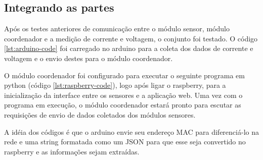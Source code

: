 \subsection{Integrando as partes}

Após os testes anteriores de comunicação entre o módulo sensor, módulo coordenador e a medição de corrente e voltagem, o conjunto foi testado. O código \ref{lst:arduino-code} foi carregado no arduino para a coleta dos dados de corrente e voltagem e o envio destes para o módulo coordenador.



O módulo coordenador foi configurado para executar o seguinte programa em python (código \ref{lst:raspberry-code}), logo após ligar o raspberry, para a inicialização da interface entre os sensores e a aplicação web. Uma vez com o programa em execução, o módulo coordenador estará pronto para escutar as requisições de envio de dados coletados dos módulos sensores. 



A idéia dos códigos é que o arduino envie seu endereço MAC para diferenciá-lo na rede e uma string formatada como um JSON para que esse seja convertido no raspberry e as informações sejam extraídas.
